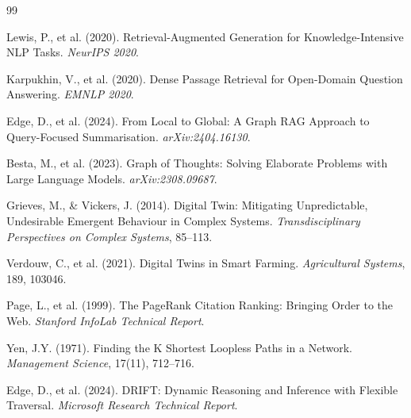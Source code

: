 \documentclass[12pt,a4paper]{article}
\begin{document}
\begin{thebibliography}{99}
\small

Lewis, P., et al. (2020). Retrieval-Augmented Generation for
Knowledge-Intensive NLP Tasks. \textit{NeurIPS 2020}.

Karpukhin, V., et al. (2020). Dense Passage Retrieval for Open-Domain
Question Answering. \textit{EMNLP 2020}.

Edge, D., et al. (2024). From Local to Global: A Graph RAG Approach to
Query-Focused Summarisation. \textit{arXiv:2404.16130}.

Besta, M., et al. (2023). Graph of Thoughts: Solving Elaborate Problems
with Large Language Models. \textit{arXiv:2308.09687}.

Grieves, M., \& Vickers, J. (2014). Digital Twin: Mitigating Unpredictable,
Undesirable Emergent Behaviour in Complex Systems. \textit{Transdisciplinary
Perspectives on Complex Systems}, 85--113.

Verdouw, C., et al. (2021). Digital Twins in Smart Farming.
\textit{Agricultural Systems}, 189, 103046.

Page, L., et al. (1999). The PageRank Citation Ranking: Bringing Order
to the Web. \textit{Stanford InfoLab Technical Report}.

Yen, J.Y. (1971). Finding the K Shortest Loopless Paths in a Network.
\textit{Management Science}, 17(11), 712--716.

Edge, D., et al. (2024). DRIFT: Dynamic Reasoning and Inference with
Flexible Traversal. \textit{Microsoft Research Technical Report}.

\end{thebibliography}
\end{document}
